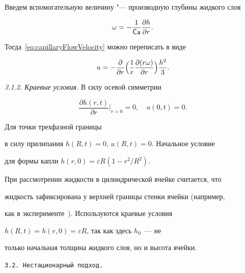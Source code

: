 Введем вспомогательную величину "--- производную глубины жидкого слоя

\begin{equation}\label{eq:LiquidLayerDepthDerivative}

\omega  =  - \frac{1}{\Ca}\frac{\partial h}{\partial r}.

\end{equation}

Тогда~\eqref{eq:capillaryFlowVelocity} можно переписать в виде

\begin{equation}\label{eq:capillaryFlowVelocitySimplified}

u =  - \frac{\partial }{\partial r}

\Bigl(\frac{1}{r}\frac{\partial

(r\omega )}{\partial r} \Bigr) \frac{h^2}{3}.

\end{equation}





\smallskip



\hypertarget{kol:3.1.2}{}



\textit{3.1.2. Краевые условия.} В силу осевой симметрии 

$$

\frac{\partial h(r, t)}{\partial r}\Big|_{r=0}= 0,\quad  u(0, t) = 0.

$$ 

Для точки трехфазной границы

в силу прилипания $h(R, t) = 0$, $u(R, t) = 0$. Начальное условие

для формы капли $h(r, 0) = \varepsilon R (1 - r^2/R^2)$.



При рассмотрении жидкости в цилиндрической ячейке считается, что

жидкость зафиксирована у верхней границы стенки ячейки (например,

как в эксперименте~\cite{Rieger}). Используются краевые условия

$h(R, t) = h(r, 0) = \varepsilon R$, так как здесь $h_0$~--- не

только начальная толщина жидкого слоя, но и высота ячейки.



\smallskip



\texttt{3.2. Нестационарный подход.}








